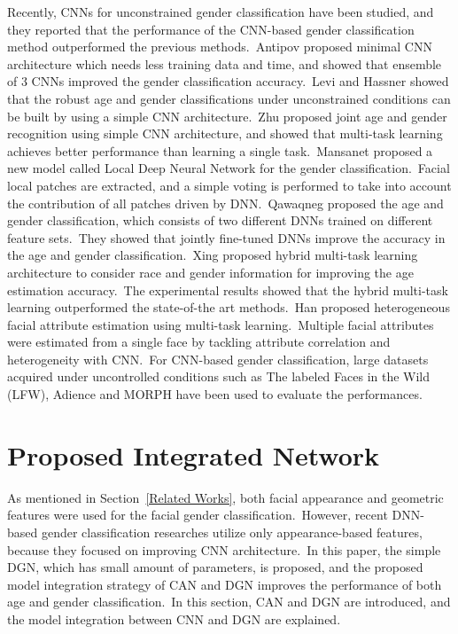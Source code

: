 \documentclass[10pt,twocolumn,letterpaper]{article}
\begin{document}
Recently, CNNs for unconstrained gender classification have been studied, and they reported that the performance of the CNN-based gender classification method outperformed the previous methods.~Antipov \etal \cite{Antipov2016} proposed minimal CNN architecture which needs less training data and time, and showed that ensemble of 3 CNNs improved the gender classification accuracy.~Levi and Hassner \cite{Levi2015} showed that the robust age and gender classifications under unconstrained conditions can be built by using a simple CNN architecture.~Zhu \etal \cite{Zhu2016} proposed joint age and gender recognition using simple CNN architecture, and showed that multi-task learning achieves better performance than learning a single task.~Mansanet \etal \cite{Mansanet2016} proposed a new model called Local Deep Neural Network for the gender classification.~Facial local patches are extracted, and a simple voting is performed to take into account the contribution of all patches driven by DNN.~Qawaqneg \etal \cite{Qawaqneh2017} proposed the age and gender classification, which consists of two different DNNs trained on different feature sets.~They showed that jointly fine-tuned DNNs improve the accuracy in the age and gender classification.~Xing \etal \cite{Xing2017} proposed hybrid multi-task learning architecture to consider race and gender information for improving the age estimation accuracy.~The experimental results showed that the hybrid multi-task learning outperformed the state-of-the art methods.~Han \etal \cite{Han2018} proposed heterogeneous facial attribute estimation using multi-task learning.~Multiple facial attributes were estimated from a single face by tackling attribute correlation and heterogeneity with CNN.~For CNN-based gender classification, large datasets acquired under uncontrolled conditions such as The labeled Faces in the Wild (LFW), Adience and MORPH have been used to evaluate the performances.

\section{Proposed Integrated Network}
As mentioned in Section~\ref{Related Works}, both facial appearance and geometric features were used for the facial gender classification.~However, recent DNN-based gender classification researches utilize only appearance-based features, because they focused on improving CNN architecture.~In this paper, the simple DGN, which has small amount of parameters, is proposed, and the proposed model integration strategy of CAN and DGN improves the performance of both age and gender classification.~In this section, CAN and DGN are introduced, and the model integration between CNN and DGN are explained. 
\end{document}
